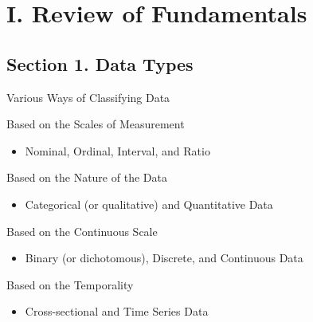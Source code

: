 \documentclass{beamer}
\begin{document}
\section{I. Review of Fundamentals}



\subsection{Section 1. Data Types}
\begin{frame}{Various Ways of Classifying Data}

Based on the Scales of Measurement
\begin{itemize}
\item Nominal, Ordinal, Interval, and Ratio
\end{itemize}

Based on the Nature of the Data
\begin{itemize}
\item Categorical (or qualitative) and Quantitative Data
\end{itemize}

Based on the Continuous Scale
\begin{itemize}
\item Binary (or dichotomous), Discrete, and Continuous Data
\end{itemize}

Based on the Temporality 
\begin{itemize}
\item Cross-sectional and Time Series Data
\end{itemize}

\end{frame}
\end{document}
